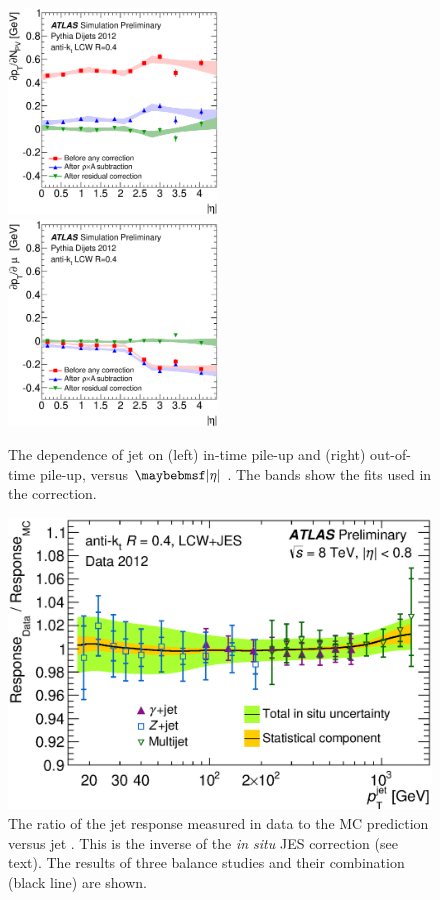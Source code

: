 \begin{figure}
	\includegraphics[width=0.495\textwidth]{tex/selection/jet_pu_npv}
	\hfill
	\includegraphics[width=0.495\textwidth]{tex/selection/jet_pu_mu}
	\caption{The dependence of jet \pt on (left) in-time pile-up and (right) 
	out-of-time pile-up, versus $\mods{\eta}$ \cite{Jets:PileupCorrection:2012}. The 
	bands show the fits used in the correction.}
	\label{fig:objects:jet_pu_corr}
\end{figure}

\begin{figure}
	\includegraphics[width=\mediumfigwidth]{tex/selection/jet_insitu_corr}
	\caption{The ratio of the jet response measured in data to the MC prediction versus 
	jet \pt. This is the inverse of the \textit{in situ} JES correction (see text). The 
	results of three \pt balance studies and their combination (black line) are shown.}
	\label{fig:objects:jet_insitu}
\end{figure}



